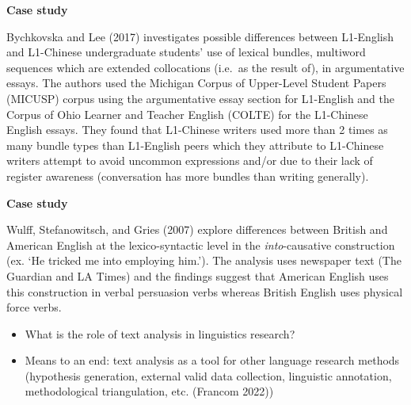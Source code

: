 \documentclass[
  letterpaper,
]{latex/krantz}
\begin{document}
\begin{tcolorbox}[enhanced jigsaw, left=2mm, arc=.35mm, colback=white, rightrule=.15mm, toprule=.15mm, breakable, leftrule=.75mm, opacityback=0, bottomrule=.15mm]

\textbf{ Case study}

Bychkovska and Lee (2017) investigates possible differences between
L1-English and L1-Chinese undergraduate students' use of lexical
bundles, multiword sequences which are extended collocations (i.e.~as
the result of), in argumentative essays. The authors used the Michigan
Corpus of Upper-Level Student Papers (MICUSP) corpus using the
argumentative essay section for L1-English and the Corpus of Ohio
Learner and Teacher English (COLTE) for the L1-Chinese English essays.
They found that L1-Chinese writers used more than 2 times as many bundle
types than L1-English peers which they attribute to L1-Chinese writers
attempt to avoid uncommon expressions and/or due to their lack of
register awareness (conversation has more bundles than writing
generally).

\end{tcolorbox}

\begin{tcolorbox}[enhanced jigsaw, left=2mm, arc=.35mm, colback=white, rightrule=.15mm, toprule=.15mm, breakable, leftrule=.75mm, opacityback=0, bottomrule=.15mm]

\textbf{ Case study}

Wulff, Stefanowitsch, and Gries (2007) explore differences between
British and American English at the lexico-syntactic level in the
\emph{into}-causative construction (ex. `He tricked me into employing
him.'). The analysis uses newspaper text (The Guardian and LA Times) and
the findings suggest that American English uses this construction in
verbal persuasion verbs whereas British English uses physical force
verbs.

\end{tcolorbox}

\begin{itemize}
\item
  What is the role of text analysis in linguistics research?
\item
  Means to an end: text analysis as a tool for other language research
  methods (hypothesis generation, external valid data collection,
  linguistic annotation, methodological triangulation, etc. (Francom
  2022))
\end{itemize}
\end{document}
